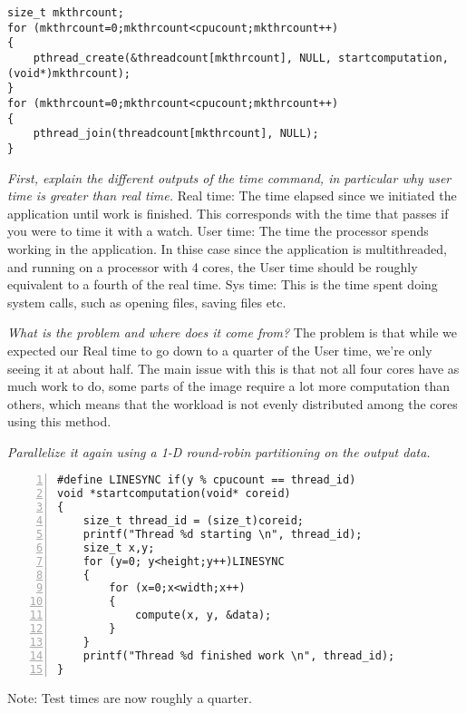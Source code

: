 \documentclass{article}
\begin{document}
\begin{ExerciseList}
\begin{lstlisting}
size_t mkthrcount;
for (mkthrcount=0;mkthrcount<cpucount;mkthrcount++)
{
	pthread_create(&threadcount[mkthrcount], NULL, startcomputation, (void*)mkthrcount);
}
for (mkthrcount=0;mkthrcount<cpucount;mkthrcount++)
{
	pthread_join(threadcount[mkthrcount], NULL);
}
\end{lstlisting}

\Question
{}
\emph{First, explain the different outputs of the time command, in
  particular why user time is greater than real time.}
\Answer Real time: The time elapsed since we initiated the application until work is finished. This corresponds with the time that passes if you were to time it with a watch. \newline
User time: The time the processor spends working in the application. In thise case since the application is multithreaded, and running on a processor with 4 cores, the User time should be roughly equivalent to a fourth of the real time. \newline
Sys time: This is the time spent doing system calls, such as opening files, saving files etc.

\Question
{} \emph{What is the problem and where does it come from?}
\Answer The problem is that while we expected our Real time to go down to a quarter of the User time, we're only seeing it at about half. The main issue with this is that not all four cores have as much work to do, some parts of the image require a lot more computation than others, which means that the workload is not evenly distributed among the cores using this method.

\Question
\emph{Parallelize it again using a 1-D round-robin partitioning on the
  output data.}

\begin{lstlisting}[basicstyle=\small\sffamily,
keywords={break,case,const,continue,default,else,enum,
for,if,return,switch,while,do,long,void,int,float,double,
char,struct,typedef,include,size\_t},
keywordstyle={\color{blue}},
comment={[l]{//}}, morecomment={[s]{/*}{*/}}, commentstyle=\itshape,
columns={[l]flexible}, numbers=left, numberstyle=\tiny,
frameround=fftt, frame=shadowbox, captionpos=b,
caption={Parallelized computation of Mandelbrot's set.},
label=LST:mandelbrot2]
#define LINESYNC if(y % cpucount == thread_id)
void *startcomputation(void* coreid)
{
    size_t thread_id = (size_t)coreid;
	printf("Thread %d starting \n", thread_id);
    size_t x,y;
	for (y=0; y<height;y++)LINESYNC
	{
		for (x=0;x<width;x++)
		{
			compute(x, y, &data);
		}
	}
	printf("Thread %d finished work \n", thread_id);
}
\end{lstlisting}
Note: Test times are now roughly a quarter.
\end{ExerciseList}
\newpage
\end{document}
